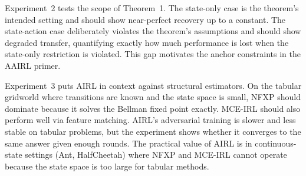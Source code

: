 \documentclass[11pt]{article}
\begin{document}
Experiment~2 tests the scope of Theorem~1.
The state-only case is the theorem's intended setting and should show near-perfect recovery up to a constant.
The state-action case deliberately violates the theorem's assumptions and should show degraded transfer, quantifying exactly how much performance is lost when the state-only restriction is violated.
This gap motivates the anchor constraints in the AAIRL primer.

Experiment~3 puts AIRL in context against structural estimators.
On the tabular gridworld where transitions are known and the state space is small, NFXP should dominate because it solves the Bellman fixed point exactly.
MCE-IRL should also perform well via feature matching.
AIRL's adversarial training is slower and less stable on tabular problems, but the experiment shows whether it converges to the same answer given enough rounds.
The practical value of AIRL is in continuous-state settings (Ant, HalfCheetah) where NFXP and MCE-IRL cannot operate because the state space is too large for tabular methods.


\end{document}
